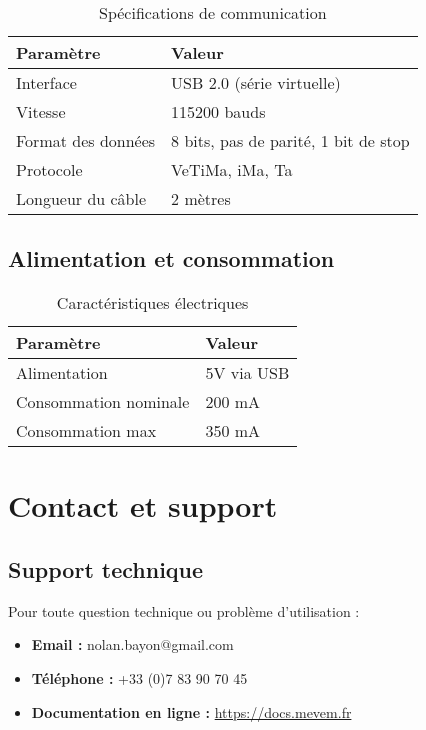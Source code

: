\documentclass[12pt,a4paper]{article}
\begin{document}
\begin{table}[H]
\centering
\begin{tabular}{|l|l|}
\hline
\textbf{Paramètre} & \textbf{Valeur} \\
\hline
Interface & USB 2.0 (série virtuelle) \\
\hline
Vitesse & 115200 bauds \\
\hline
Format des données & 8 bits, pas de parité, 1 bit de stop \\
\hline
Protocole & VeTiMa, iMa, Ta \\
\hline
Longueur du câble & 2 mètres \\
\hline
\end{tabular}
\caption{Spécifications de communication}
\label{tab:specs_comm}
\end{table}

\subsection{Alimentation et consommation}

\begin{table}[H]
\centering
\begin{tabular}{|l|l|}
\hline
\textbf{Paramètre} & \textbf{Valeur} \\
\hline
Alimentation & 5V via USB \\
\hline
Consommation nominale & 200 mA \\
\hline
Consommation max & 350 mA \\
\hline
\end{tabular}
\caption{Caractéristiques électriques}
\label{tab:specs_elec}
\end{table}

\section{Contact et support}

\subsection{Support technique}

Pour toute question technique ou problème d'utilisation :

\begin{itemize}
    \item \textbf{Email :} nolan.bayon@gmail.com
    \item \textbf{Téléphone :} +33 (0)7 83 90 70 45
    \item \textbf{Documentation en ligne :} \url{https://docs.mevem.fr}
\end{itemize}
\end{document}
